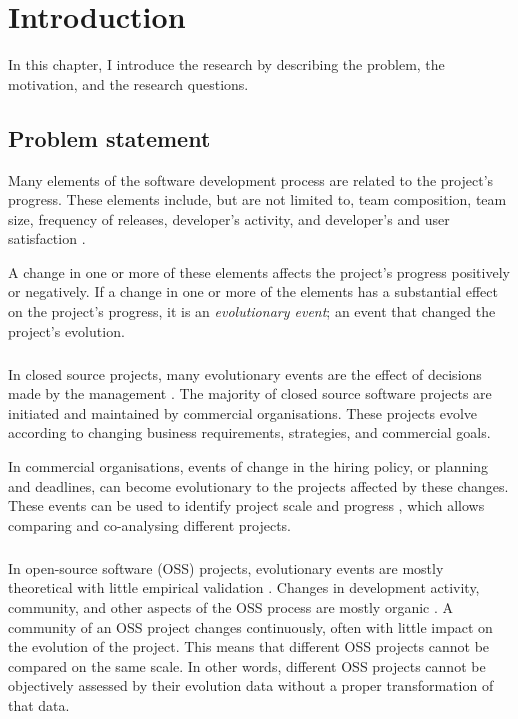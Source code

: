 \chapter{Introduction}
\label{introduction}

In this chapter, I introduce the research by describing the problem, the
motivation, and the research questions.

\section{Problem statement}
Many elements of the software development process are related to the project's
progress. These elements include, but are not limited to, team composition,
team size, frequency of releases, developer's activity, and developer's and
user satisfaction \cite{crowston2006, delone1992, samoladas2010}.

A change in one or more of these elements affects the project's progress
positively or negatively. If a change in one or more of the elements has a
substantial effect on the project's progress, it is an \emph{evolutionary
event}\rm; an event that changed the project's evolution.

\paragraph{}
In closed source projects, many evolutionary events are the effect of decisions
made by the management \cite{karus2013}. The majority of closed source software
projects are initiated and maintained by commercial organisations. These
projects evolve according to changing business requirements, strategies, and
commercial goals.

In commercial organisations, events of change in the hiring policy, or
planning and deadlines, can become evolutionary to the projects affected by
these changes. These events can be used to identify project scale and progress
\cite{karus2013}, which allows comparing and co-analysing different projects.

\paragraph{}
In open-source software (OSS) projects, evolutionary events are mostly
theoretical with little empirical validation \cite{karus2013}. Changes in
development activity, community, and other aspects of the OSS process are
mostly organic \cite{androutsellis}. A community of an OSS project changes
continuously, often with little impact on the evolution of the project. This
means that different OSS projects cannot be compared on the same scale. In
other words, different OSS projects cannot be objectively assessed by their
evolution data without a proper transformation of that data.

